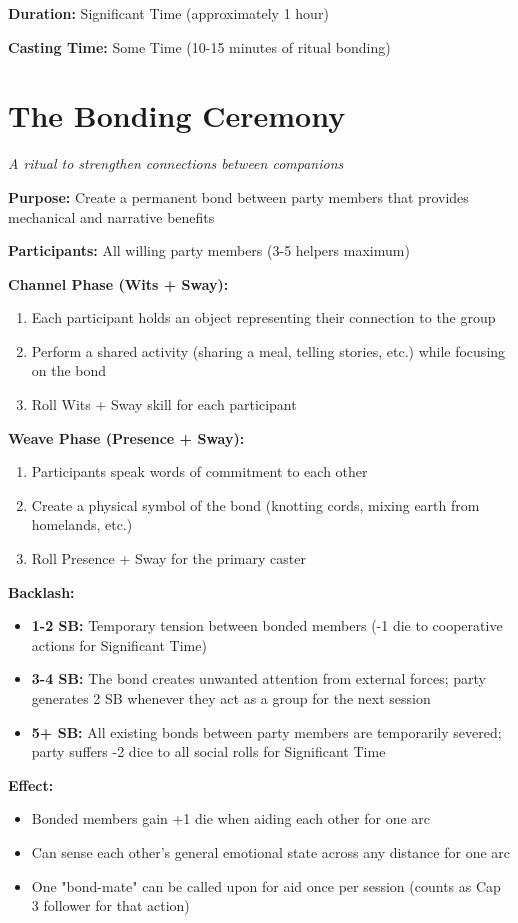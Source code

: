 \textbf{Duration:} Significant Time (approximately 1 hour)

\textbf{Casting Time:} Some Time (10-15 minutes of ritual bonding)

\section*{The Bonding Ceremony}
\textit{A ritual to strengthen connections between companions}

\textbf{Purpose:} Create a permanent bond between party members that provides mechanical and narrative benefits

\textbf{Participants:} All willing party members (3-5 helpers maximum)

\textbf{Channel Phase (Wits + Sway):}
\begin{enumerate}
\item Each participant holds an object representing their connection to the group
\item Perform a shared activity (sharing a meal, telling stories, etc.) while focusing on the bond
\item Roll Wits + Sway skill for each participant
\end{enumerate}

\textbf{Weave Phase (Presence + Sway):}
\begin{enumerate}
\item Participants speak words of commitment to each other
\item Create a physical symbol of the bond (knotting cords, mixing earth from homelands, etc.)
\item Roll Presence + Sway for the primary caster
\end{enumerate}

\textbf{Backlash:}
\begin{itemize}
\item \textbf{1-2 SB:} Temporary tension between bonded members (-1 die to cooperative actions for Significant Time)
\item \textbf{3-4 SB:} The bond creates unwanted attention from external forces; party generates 2 SB whenever they act as a group for the next session
\item \textbf{5+ SB:} All existing bonds between party members are temporarily severed; party suffers -2 dice to all social rolls for Significant Time
\end{itemize}

\textbf{Effect:}
\begin{itemize}
\item Bonded members gain +1 die when aiding each other for one arc
\item Can sense each other's general emotional state across any distance for one arc
\item One "bond-mate" can be called upon for aid once per session (counts as Cap 3 follower for that action)
\end{itemize}

